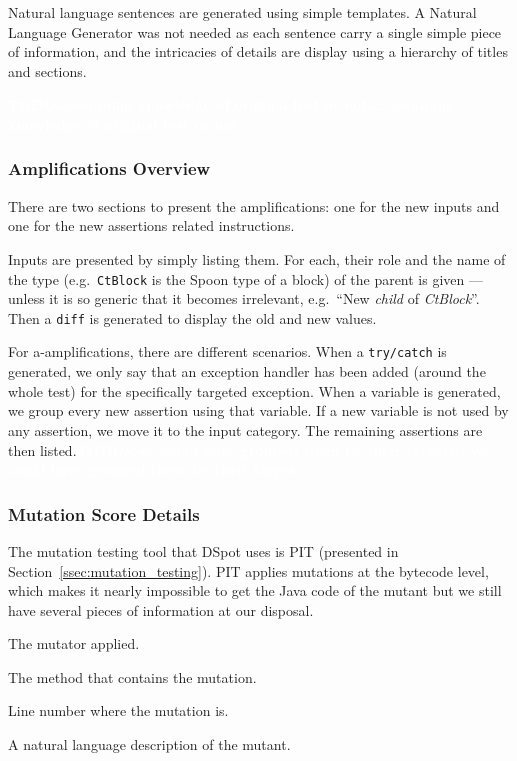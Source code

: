 \documentclass[a4paper,11pt]{sdm_internship}
\newcommand{\todo}[1]{\colorbox{Red!75}{\textcolor{white}{\textbf{TODO\ifx&#1&\else: #1\fi}}}}
\newcommand{\dspot}{DSpot\xspace}
\theoremstyle{definition}
\begin{document}
Natural language sentences are generated using simple templates.
A Natural Language Generator was not needed as each sentence carry a single simple piece of information, and the intricacies of details are display using a hierarchy of titles and sections.

\todo{assuming knowledge of original test or not}

\subsubsection{Amplifications Overview}%
\label{sssec:amp_overview}
There are two sections to present the amplifications: one for the new inputs and one for the new assertions related instructions.

Inputs are presented by simply listing them.
For each, their role and the name of the type (e.g.\ \texttt{CtBlock} is the Spoon type of a block) of the parent is given --- unless it is so generic that it becomes irrelevant, e.g.\ ``New \textit{child} of \textit{CtBlock}''.
Then a \texttt{diff} is generated to display the old and new values.

For a-amplifications, there are different scenarios.
When a \texttt{try/catch} is generated, we only say that an exception handler has been added (around the whole test) for the specifically targeted exception.
When a variable is generated, we group every new assertion using that variable.
If a new variable is not used by any assertion, we move it to the input category.
The remaining assertions are then listed.\todo{we could have grouped them by their target}

\subsubsection{Mutation Score Details}%
\label{sssec:mutants_details}
The mutation testing tool that \dspot{} uses is PIT (presented in Section~\ref{ssec:mutation_testing}).
PIT applies mutations at the bytecode level, which makes it nearly impossible to get the Java code of the mutant but we still have several pieces of information at our disposal.
\begin{description}[itemindent=0em,labelwidth=9em,leftmargin=9em,align=right]
  \item[\texttt{mutantOperator}] The mutator applied.
  \item[\texttt{mutatedMethod}] The method that contains the mutation.
  \item[\texttt{lineNumber}] Line number where the mutation is.
  \item[\texttt{description}] A natural language description of the mutant.
\end{description}
\end{document}
